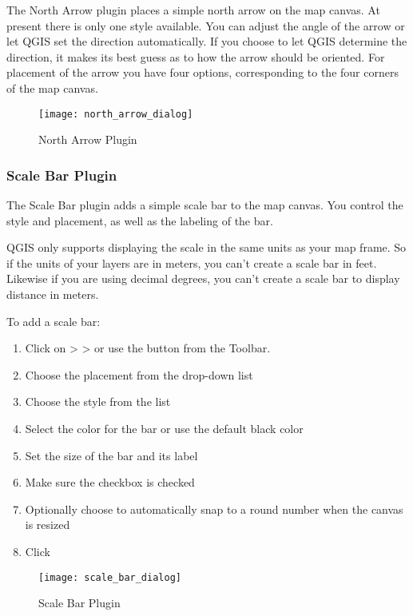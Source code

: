 The North Arrow plugin places a simple north arrow on the map canvas. At
present there is only one style available. You can adjust the angle of the
arrow or let QGIS set the direction automatically. If you choose to let
QGIS determine the direction, it makes its best guess as to how the arrow
should be oriented. For placement of the arrow you have four options, 
corresponding to the four corners of the map canvas.

\begin{figure}[ht]
   \begin{center}
   \caption{North Arrow Plugin \nixcaption}\label{fig:north_arrow}\smallskip
   \texttt{[image: north\_arrow\_dialog]}
\end{center}  
\end{figure}

\subsubsection{Scale Bar Plugin}
The Scale Bar plugin adds a simple scale bar to the map canvas. You
control the style and placement, as well as the labeling of the bar. 

QGIS only supports displaying the scale in the same units as your map frame. So
if the units of your layers are in meters, you can't create a scale bar in
feet. Likewise if you are using decimal degrees, you can't create a scale
bar to display distance in meters.

To add a scale bar:

\begin{enumerate}
\item Click on  >  >  or use the  button from the Toolbar.
\item Choose the placement from the  drop-down list
\item Choose the style from the  list
\item Select the color for the bar  or use the default black color
\item Set the size of the bar and its label 
\item Make sure the  checkbox is checked
\item Optionally choose to automatically snap to a round number when the
  canvas is resized 
\item Click  
\end{enumerate} 

\begin{figure}[ht]
   \begin{center}
   \caption{Scale Bar Plugin \nixcaption}\label{fig:scale_bar}\smallskip
   \texttt{[image: scale\_bar\_dialog]}
\end{center}  
\end{figure}
